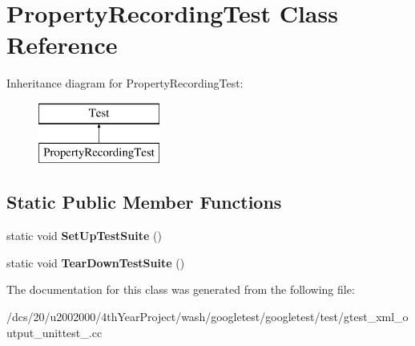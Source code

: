 \hypertarget{classPropertyRecordingTest}{}\section{Property\+Recording\+Test Class Reference}
\label{classPropertyRecordingTest}
Inheritance diagram for Property\+Recording\+Test\+:\begin{figure}[H]
\begin{center}
\leavevmode
\includegraphics[height=2.000000cm]{classPropertyRecordingTest}
\end{center}
\end{figure}
\subsection*{Static Public Member Functions}
\begin{DoxyCompactItemize}
\item 
\mbox{\label{classPropertyRecordingTest_af50508f07246f73711510e081ba43eaa}} 
static void {\bfseries Set\+Up\+Test\+Suite} ()
\item 
\mbox{\label{classPropertyRecordingTest_ad6a000f710b6ecc7ee06a74ca722668b}} 
static void {\bfseries Tear\+Down\+Test\+Suite} ()
\end{DoxyCompactItemize}


The documentation for this class was generated from the following file\+:\begin{DoxyCompactItemize}
\item 
/dcs/20/u2002000/4th\+Year\+Project/wash/googletest/googletest/test/gtest\+\_\+xml\+\_\+output\+\_\+unittest\+\_\+.\+cc\end{DoxyCompactItemize}
